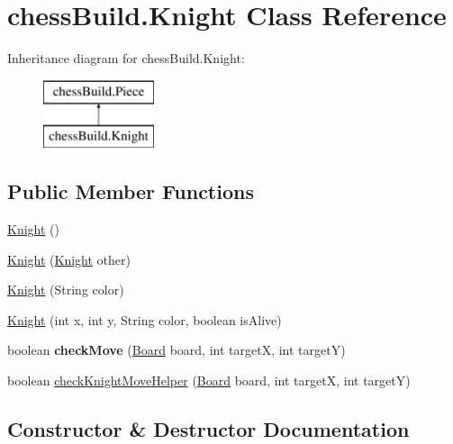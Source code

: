 \hypertarget{classchess_build_1_1_knight}{}\section{chess\+Build.\+Knight Class Reference}
\label{classchess_build_1_1_knight}
Inheritance diagram for chess\+Build.\+Knight\+:\begin{figure}[H]
\begin{center}
\leavevmode
\includegraphics[height=2.000000cm]{classchess_build_1_1_knight}
\end{center}
\end{figure}
\subsection*{Public Member Functions}
\begin{DoxyCompactItemize}
\item 
\hyperlink{classchess_build_1_1_knight_ae863e0fcef4d27a72dbbc1d70eed38a0}{Knight} ()
\item 
\hyperlink{classchess_build_1_1_knight_ad282a386bcf3eb2550bb0ddbaedb4fef}{Knight} (\hyperlink{classchess_build_1_1_knight}{Knight} other)
\item 
\hyperlink{classchess_build_1_1_knight_a52b03f556c615328116b62f3f2c4bb0a}{Knight} (String color)
\item 
\hyperlink{classchess_build_1_1_knight_af9b14f7aa9226db9fa45b15f1f0cce62}{Knight} (int x, int y, String color, boolean is\+Alive)
\item 
\mbox{\label{classchess_build_1_1_knight_a2022e09206aad380d14f4a1fa8b11baa}} 
boolean {\bfseries check\+Move} (\hyperlink{classchess_build_1_1_board}{Board} board, int targetX, int targetY)
\item 
boolean \hyperlink{classchess_build_1_1_knight_ad16ac9f8e4eca01d4f357d301b828f9c}{check\+Knight\+Move\+Helper} (\hyperlink{classchess_build_1_1_board}{Board} board, int targetX, int targetY)
\end{DoxyCompactItemize}


\subsection{Constructor \& Destructor Documentation}
\mbox{\label{classchess_build_1_1_knight_ae863e0fcef4d27a72dbbc1d70eed38a0}} 
